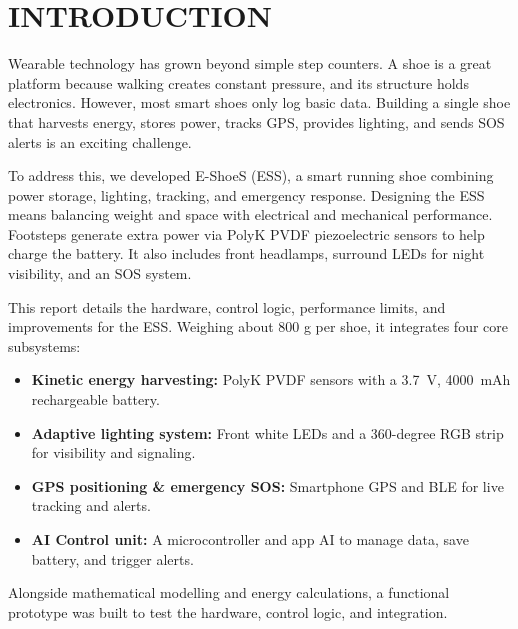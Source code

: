 \chapter{INTRODUCTION}
Wearable technology has grown beyond simple step counters. A shoe is a great platform because walking creates constant pressure, and its structure holds electronics. However, most smart shoes only log basic data. Building a single shoe that harvests energy, stores power, tracks GPS, provides lighting, and sends SOS alerts is an exciting challenge.

To address this, we developed E-ShoeS (ESS), a smart running shoe combining power storage, lighting, tracking, and emergency response. Designing the ESS means balancing weight and space with electrical and mechanical performance. Footsteps generate extra power via PolyK PVDF piezoelectric sensors to help charge the battery. It also includes front headlamps, surround LEDs for night visibility, and an SOS system.

This report details the hardware, control logic, performance limits, and improvements for the ESS\@. Weighing about 800 g per shoe, it integrates four core subsystems:
\begin{itemize}[label=--]
    \item \textbf{Kinetic energy harvesting:} PolyK PVDF sensors with a 3.7~V, 4000~mAh rechargeable battery.
    \item \textbf{Adaptive lighting system:} Front white LEDs and a 360-degree RGB strip for visibility and signaling.
    \item \textbf{GPS positioning \& emergency SOS\@:} Smartphone GPS and BLE for live tracking and alerts.
    \item \textbf{AI Control unit:} A microcontroller and app AI to manage data, save battery, and trigger alerts.
\end{itemize}

Alongside mathematical modelling and energy calculations, a functional prototype was built to test the hardware, control logic, and integration.